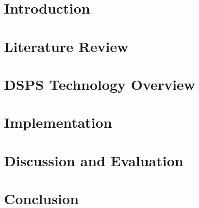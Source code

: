 \documentclass[a4paper,11pt]{article}
\begin{document}



\section{Introduction}
\label{sec:intro}



\section{Literature Review}
\label{sec:litrev}



\section{DSPS Technology Overview}
\label{sec:overview}



\section{Implementation}
\label{sec:implementation}



\section{Discussion and Evaluation}
\label{sec:evaluation}



\section{Conclusion}
\label{sec:conclusion}





\end{document}
